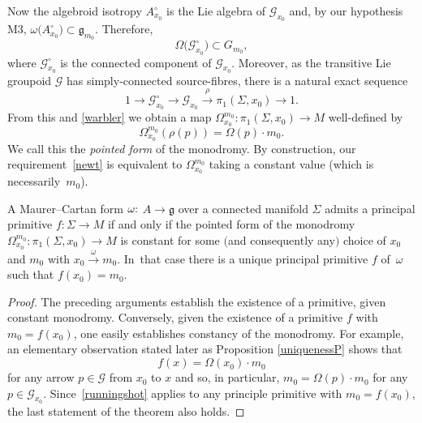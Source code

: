 Now the algebroid isotropy $A^\circ_{x_0}$ is the Lie algebra of
${\mathcal G}_{x_0} $ and, by our hypothesis M3,
$\omega\big(A^\circ_{x_0}\big) \allowbreak\subset {\mathfrak g}_{m_0}$. Therefore,
\begin{equation} \Omega\big({\mathcal G}_{x_0}^\circ\big) \subset G_{m_0},
\label{warbler}
\end{equation}
where ${\mathcal G}_{x_0}^\circ$ is the connected
component of ${\mathcal G}_{x_0}$. Moreover, as the transitive Lie
groupoid ${\mathcal G} $ has simply-connected source-fibres, there is
a natural exact sequence
\begin{equation*}
1 \rightarrow {\mathcal G}_{x_0}^\circ \rightarrow
{\mathcal G}_{x_0}\xrightarrow{\rho} \pi_1(\Sigma, x_0) \rightarrow 1.
\end{equation*} From this and \eqref{warbler} we obtain a map
$\Omega_{x_0}^{m_0} \colon \pi_1(\Sigma ,x_0) \rightarrow M$
well-defined by
\begin{equation*} \Omega_{x_0}^{m_0}(\rho ( p))=\Omega(p) \cdot m_0.
\end{equation*}
We call this the {\it pointed form} of the
monodromy. By construction, our requirement~\eqref{newt} is equivalent
to $\Omega_{x_0}^{m_0}$ taking a constant value (which is necessarily~$m_0$).

\begin{Theorem}\label{outlineT}
 A Maurer--Cartan form $\omega{\rm :}$ $A \rightarrow {\mathfrak g} $
 over a connected manifold $\Sigma $ admits a principal primitive
 $f \colon \Sigma \rightarrow M$ if and only if the pointed form of
 the monodromy
 $\Omega_{x_0}^{m_0} \colon \pi_1(\Sigma, x_0) \rightarrow M$ is
 constant for some $($and consequently any$)$ choice of $x_0$ and $m_0$
 with $x_0\xrightarrow{\omega}m_0$. In~that case there is a unique
 principal primitive $f$ of~$\omega $ such that $f(x_0)=m_0$.
\end{Theorem}

\begin{proof}The preceding arguments establish the existence of a
primitive, given constant monodromy. Conversely, given the existence
of a primitive $f$ with $m_0=f(x_0)$, one easily establishes constancy
of the monodromy. For example, an elementary observation stated later
as Proposition \ref{uniquenessP} shows that
 \begin{equation}
 f(x) = \Omega (x_0)\cdot m_0\label{runningshot}
 \end{equation}
 for any arrow $p \in {\mathcal G} $ from $x_0$ to $x$ and so, in particular, $m_0=\Omega (p)\cdot m_0$ for any $p \in
{\mathcal G}_{x_0}$. Since~\eqref{runningshot} applies to any
principle primitive with $m_0=f(x_0)$, the last statement of the
theorem also holds.
\end{proof}

